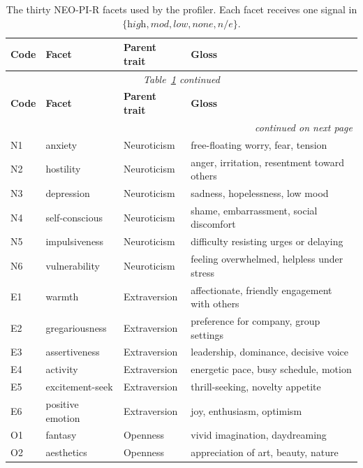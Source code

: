 \documentclass[../main.tex]{subfiles}
\begin{document}
\begin{longtable}{p{1.4cm}p{3.0cm}p{2.6cm}p{6.0cm}}
  \caption{The thirty NEO-PI-R facets used by the profiler. Each facet receives
    one signal in $\{\textit{high},\textit{mod},\textit{low},\textit{none},
    \textit{n/e}\}$.}
  \label{tab:facets}\\
  \toprule
  \textbf{Code} & \textbf{Facet} & \textbf{Parent trait} & \textbf{Gloss} \\
  \midrule
  \endfirsthead
  \multicolumn{4}{c}{\textit{Table~\ref{tab:facets} continued}}\\
  \toprule
  \textbf{Code} & \textbf{Facet} & \textbf{Parent trait} & \textbf{Gloss} \\
  \midrule
  \endhead
  \midrule \multicolumn{4}{r}{\textit{continued on next page}}\\
  \endfoot
  \bottomrule
  \endlastfoot
  N1 & anxiety           & Neuroticism       & free-floating worry, fear, tension \\
  N2 & hostility         & Neuroticism       & anger, irritation, resentment toward others \\
  N3 & depression        & Neuroticism       & sadness, hopelessness, low mood \\
  N4 & self-conscious    & Neuroticism       & shame, embarrassment, social discomfort \\
  N5 & impulsiveness     & Neuroticism       & difficulty resisting urges or delaying \\
  N6 & vulnerability     & Neuroticism       & feeling overwhelmed, helpless under stress \\
  E1 & warmth            & Extraversion      & affectionate, friendly engagement with others \\
  E2 & gregariousness    & Extraversion      & preference for company, group settings \\
  E3 & assertiveness     & Extraversion      & leadership, dominance, decisive voice \\
  E4 & activity          & Extraversion      & energetic pace, busy schedule, motion \\
  E5 & excitement-seek   & Extraversion      & thrill-seeking, novelty appetite \\
  E6 & positive emotion  & Extraversion      & joy, enthusiasm, optimism \\
  O1 & fantasy           & Openness          & vivid imagination, daydreaming \\
  O2 & aesthetics        & Openness          & appreciation of art, beauty, nature \\

\end{longtable}
\end{document}
